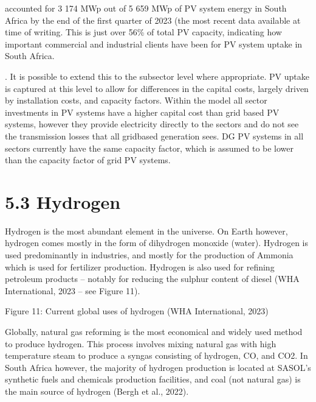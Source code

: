 \documentclass[letterpaper,10pt,english]{jupyterBook}
\begin{document}
\sphinxAtStartPar
{} accounted for 3 174 MWp out of 5 659 MWp of PV system energy in South Africa by the end of the first quarter of 2023 (the most recent data available at time of writing. This is just over 56\% of total PV capacity, indicating how important commercial and industrial clients have been for PV system uptake in South Africa.

\sphinxAtStartPar
{}. It is possible to extend this to the sub\sphinxhyphen{}sector level where appropriate. PV uptake is captured at this level to allow for differences in the capital costs, largely driven by installation costs, and capacity factors. Within the model all sector investments in PV systems have a higher capital cost than grid based PV systems, however they provide electricity directly to the sectors and do not see the transmission losses that all grid\sphinxhyphen{}based generation sees. DG PV systems in all sectors currently have the same capacity factor, which is assumed to be lower than the capacity factor of grid PV systems.


\section{5.3 Hydrogen}
\label{\detokenize{05Crosscuttingindustries:hydrogen}}
\sphinxAtStartPar
Hydrogen is the most abundant element in the universe. On Earth however, hydrogen comes mostly in the form of dihydrogen monoxide (water). Hydrogen is used predominantly in industries, and mostly for the production of Ammonia which is used for fertilizer production. Hydrogen is also used for refining petroleum products – notably for reducing the sulphur content of diesel (WHA International, 2023 – see Figure 11).

\sphinxAtStartPar
{}Figure 11: Current global uses of hydrogen (WHA International, 2023)

\sphinxAtStartPar
Globally, natural gas reforming is the most economical and widely used method to produce hydrogen. This process involves mixing natural gas with high temperature steam to produce a syngas consisting of hydrogen, CO, and CO2. In South Africa however, the majority of hydrogen production is located at SASOL’s synthetic fuels and chemicals production facilities, and coal (not natural gas) is the main source of hydrogen (Bergh et al., 2022).
\end{document}
